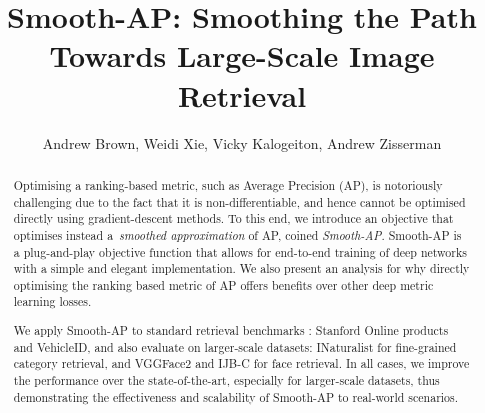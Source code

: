 \documentclass[runningheads]{llncs}
\begin{document}
\pagestyle{headings}
\mainmatter
\def\ECCVSubNumber{929}  

\title{Smooth-AP: Smoothing the Path \\ Towards Large-Scale Image Retrieval} 

\begin{comment}

\authorrunning{A. Brown \textit{et al.}}
\author{Andrew Brown,
Weidi Xie,
Vicky Kalogeiton and
Andrew Zisserman}
\institute{Visual Geometry Group, Department of Engineering Science,\\
University of Oxford\\
\email{\{abrown,weidi,vicky,az\}@robots.ox.ac.uk}}
\end{comment}




\author{Andrew Brown, Weidi Xie, Vicky Kalogeiton, Andrew Zisserman}

\maketitle

\begin{abstract}
Optimising a ranking-based metric, such as Average Precision (AP), 
is notoriously challenging due to the fact that it is non-differentiable, 
and hence cannot be optimised directly using gradient-descent methods. 
To this end, we introduce an objective that optimises instead a~{\em smoothed approximation} of AP, coined {\em Smooth-AP}.  
Smooth-AP is a plug-and-play objective function that allows for end-to-end training of deep networks with a simple and elegant implementation. 
We also present an analysis for why directly optimising the ranking based metric of AP offers benefits over other deep metric learning losses.

We apply Smooth-AP to standard retrieval benchmarks : 
Stanford Online products and VehicleID,
and also evaluate on larger-scale datasets: 
INaturalist for fine-grained category retrieval, and VGGFace2 and IJB-C for face retrieval. 
In all cases, 
we improve the performance over the state-of-the-art, 
especially for larger-scale datasets, 
thus demonstrating the effectiveness and scalability of Smooth-AP to real-world scenarios. 
\end{abstract}
\end{document}
